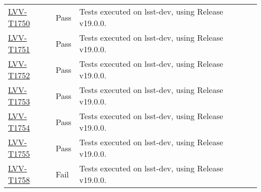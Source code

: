 \documentclass[DM,lsstdraft,STR,toc]{lsstdoc}
\begin{document}
\begin{longtable}{p{2cm}p{2.5cm}p{9cm}p{2.5cm}}
\begin{minipage}[]{9cm}
    \medskip
    \end{minipage}
    &
    \\\hline
\href{https://jira.lsstcorp.org/secure/Tests.jspa#/testCase/LVV-T1750}{LVV-T1750}
    & Pass &
    \begin{minipage}[]{9cm}
    \smallskip
     Tests executed on lsst-dev, using Release v19.0.0.

    \medskip
    \end{minipage}
    &
    \\\hline
\href{https://jira.lsstcorp.org/secure/Tests.jspa#/testCase/LVV-T1751}{LVV-T1751}
    & Pass &
    \begin{minipage}[]{9cm}
    \smallskip
     Tests executed on lsst-dev, using Release v19.0.0.

    \medskip
    \end{minipage}
    &
    \\\hline
\href{https://jira.lsstcorp.org/secure/Tests.jspa#/testCase/LVV-T1752}{LVV-T1752}
    & Pass &
    \begin{minipage}[]{9cm}
    \smallskip
     Tests executed on lsst-dev, using Release v19.0.0.

    \medskip
    \end{minipage}
    &
    \\\hline
\href{https://jira.lsstcorp.org/secure/Tests.jspa#/testCase/LVV-T1753}{LVV-T1753}
    & Pass &
    \begin{minipage}[]{9cm}
    \smallskip
     Tests executed on lsst-dev, using Release v19.0.0.

    \medskip
    \end{minipage}
    &
    \\\hline
\href{https://jira.lsstcorp.org/secure/Tests.jspa#/testCase/LVV-T1754}{LVV-T1754}
    & Pass &
    \begin{minipage}[]{9cm}
    \smallskip
     Tests executed on lsst-dev, using Release v19.0.0.

    \medskip
    \end{minipage}
    &
    \\\hline
\href{https://jira.lsstcorp.org/secure/Tests.jspa#/testCase/LVV-T1755}{LVV-T1755}
    & Pass &
    \begin{minipage}[]{9cm}
    \smallskip
     Tests executed on lsst-dev, using Release v19.0.0.

    \medskip
    \end{minipage}
    &
    \\\hline
\href{https://jira.lsstcorp.org/secure/Tests.jspa#/testCase/LVV-T1758}{LVV-T1758}
    & Fail &
    \begin{minipage}[]{9cm}
    \smallskip
     Tests executed on lsst-dev, using Release v19.0.0.


\end{minipage}
\end{longtable}
\end{document}
